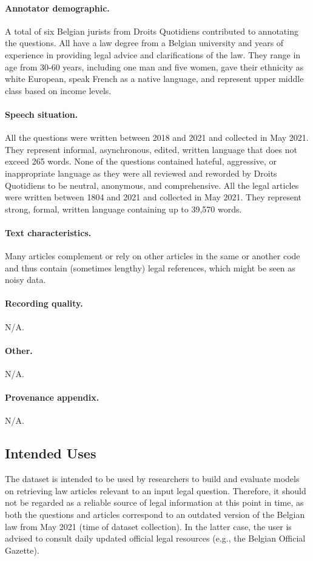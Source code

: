 \documentclass[11pt]{article}
\begin{document}
\paragraph{Annotator demographic.}
A total of six Belgian jurists from Droits Quotidiens contributed to annotating the questions. All have a law degree from a Belgian university and years of experience in providing legal advice and clarifications of the law. They range in age from 30-60 years, including one man and five women, gave their ethnicity as white European, speak French as a native language, and represent upper middle class based on income levels.

\paragraph{Speech situation.}
All the questions were written between 2018 and 2021 and collected in May 2021. They represent informal, asynchronous, edited, written language that does not exceed 265 words. None of the questions contained hateful, aggressive, or inappropriate language as they were all reviewed and reworded by Droits Quotidiens to be neutral, anonymous, and comprehensive. All the legal articles were written between 1804 and 2021 and collected in May 2021. They represent strong, formal, written language containing up to 39,570 words.

\paragraph{Text characteristics.}
Many articles complement or rely on other articles in the same or another code and thus contain (sometimes lengthy) legal references, which might be seen as noisy data.

\paragraph{Recording quality.}
N/A.

\paragraph{Other.}
N/A.

\paragraph{Provenance appendix.}
N/A.


\subsection{Intended Uses}
The dataset is intended to be used by researchers to build and evaluate models on retrieving law articles relevant to an input legal question. Therefore, it should not be regarded as a reliable source of legal information at this point in time, as both the questions and articles correspond to an outdated version of the Belgian law from May 2021 (time of dataset collection). In the latter case, the user is advised to consult daily updated official legal resources (e.g., the Belgian Official Gazette).
\end{document}
